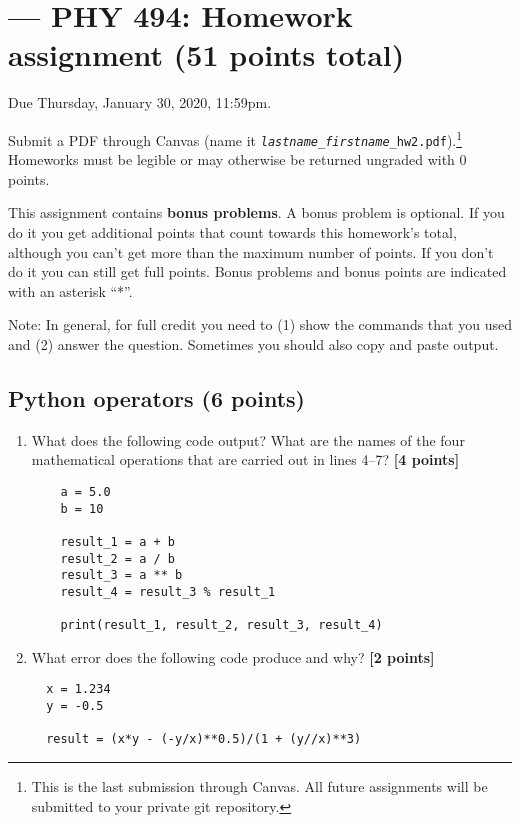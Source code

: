 \documentclass[letterpaper]{scrartcl}
\newcommand{\anumber}{2}
\newcounter{TotalPoints}
\newcommand{\points}[1]{\textbf{[#1 points]}\stepcounter{TotalPoints}}
\newenvironment{enuma}{\begin{enumerate}[label=(\alph*)]}{\end{enumerate}}
\begin{document}

\setcounter{section}{\anumber}
\addtocounter{section}{-1}
\section{ --- PHY 494: Homework assignment (51 points total)}

\noindent Due Thursday, January 30, 2020, 11:59pm.

\noindent Submit a PDF through Canvas (name it
\texttt{\emph{lastname}\_\emph{firstname}\_hw\anumber.pdf}).\footnote{This
is the last submission through Canvas. All future assignments will be
submitted to your private git repository.}
Homeworks must be legible or may otherwise be returned ungraded with 0
points.


This assignment contains \textbf{bonus problems}. A bonus problem is
optional. If you do it you get additional points that count towards
this homework's total, although you can't get more than the maximum
number of points. If you don't do it you can still get full
points. Bonus problems and bonus points are indicated with an asterisk
``*''.

Note: In general, for full credit you need to (1) show the commands
that you used and (2) answer the question. Sometimes you should also
copy and paste output.

\subsection{Python operators (6 points)}

\begin{enuma}
\item What does the following code output? What are the names of the four
  mathematical operations that are carried out in lines 4--7? \points{4}
  \begin{verbatim}
    a = 5.0
    b = 10
    
    result_1 = a + b
    result_2 = a / b
    result_3 = a ** b
    result_4 = result_3 % result_1
    
    print(result_1, result_2, result_3, result_4)
  \end{verbatim}
\item What error does the following code produce and why? \points{2}
  \begin{verbatim}
  x = 1.234
  y = -0.5

  result = (x*y - (-y/x)**0.5)/(1 + (y//x)**3)
  \end{verbatim}
\end{enuma}
\end{document}
